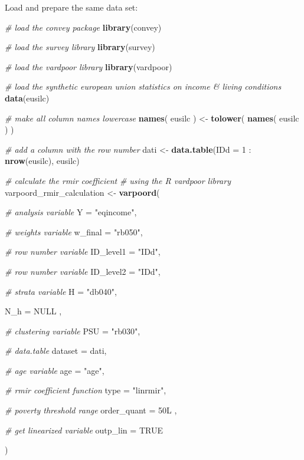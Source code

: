 \documentclass[]{book}
\newenvironment{Shaded}{\begin{snugshade}}{\end{snugshade}}
\newcommand{\KeywordTok}[1]{\textcolor[rgb]{0.13,0.29,0.53}{\textbf{{#1}}}}
\newcommand{\DataTypeTok}[1]{\textcolor[rgb]{0.13,0.29,0.53}{{#1}}}
\newcommand{\DecValTok}[1]{\textcolor[rgb]{0.00,0.00,0.81}{{#1}}}
\newcommand{\StringTok}[1]{\textcolor[rgb]{0.31,0.60,0.02}{{#1}}}
\newcommand{\CommentTok}[1]{\textcolor[rgb]{0.56,0.35,0.01}{\textit{{#1}}}}
\newcommand{\OtherTok}[1]{\textcolor[rgb]{0.56,0.35,0.01}{{#1}}}
\newcommand{\NormalTok}[1]{{#1}}
\begin{document}
Load and prepare the same data set:

\begin{Shaded}
\begin{Highlighting}[]
\CommentTok{# load the convey package}
\KeywordTok{library}\NormalTok{(convey)}

\CommentTok{# load the survey library}
\KeywordTok{library}\NormalTok{(survey)}

\CommentTok{# load the vardpoor library}
\KeywordTok{library}\NormalTok{(vardpoor)}

\CommentTok{# load the synthetic european union statistics on income & living conditions}
\KeywordTok{data}\NormalTok{(eusilc)}

\CommentTok{# make all column names lowercase}
\KeywordTok{names}\NormalTok{( eusilc ) <-}\StringTok{ }\KeywordTok{tolower}\NormalTok{( }\KeywordTok{names}\NormalTok{( eusilc ) )}

\CommentTok{# add a column with the row number}
\NormalTok{dati <-}\StringTok{ }\KeywordTok{data.table}\NormalTok{(}\DataTypeTok{IDd =} \DecValTok{1} \NormalTok{:}\StringTok{ }\KeywordTok{nrow}\NormalTok{(eusilc), eusilc)}

\CommentTok{# calculate the rmir coefficient}
\CommentTok{# using the R vardpoor library}
\NormalTok{varpoord_rmir_calculation <-}
\StringTok{    }\KeywordTok{varpoord}\NormalTok{(}
    
        \CommentTok{# analysis variable}
        \DataTypeTok{Y =} \StringTok{"eqincome"}\NormalTok{, }
        
        \CommentTok{# weights variable}
        \DataTypeTok{w_final =} \StringTok{"rb050"}\NormalTok{,}
        
        \CommentTok{# row number variable}
        \DataTypeTok{ID_level1 =} \StringTok{"IDd"}\NormalTok{,}
        
        \CommentTok{# row number variable}
        \DataTypeTok{ID_level2 =} \StringTok{"IDd"}\NormalTok{,}
        
        \CommentTok{# strata variable}
        \DataTypeTok{H =} \StringTok{"db040"}\NormalTok{, }
        
        \DataTypeTok{N_h =} \OtherTok{NULL} \NormalTok{,}
        
        \CommentTok{# clustering variable}
        \DataTypeTok{PSU =} \StringTok{"rb030"}\NormalTok{, }
        
        \CommentTok{# data.table}
        \DataTypeTok{dataset =} \NormalTok{dati,}
      
      \CommentTok{# age variable}
      \DataTypeTok{age =} \StringTok{"age"}\NormalTok{,}
        
        \CommentTok{# rmir coefficient function}
        \DataTypeTok{type =} \StringTok{"linrmir"}\NormalTok{,}
      
      \CommentTok{# poverty threshold range}
      \DataTypeTok{order_quant =} \NormalTok{50L ,}
      
      \CommentTok{# get linearized variable}
      \DataTypeTok{outp_lin =} \OtherTok{TRUE}
        
    \NormalTok{)}
\end{Highlighting}
\end{Shaded}
\end{document}
